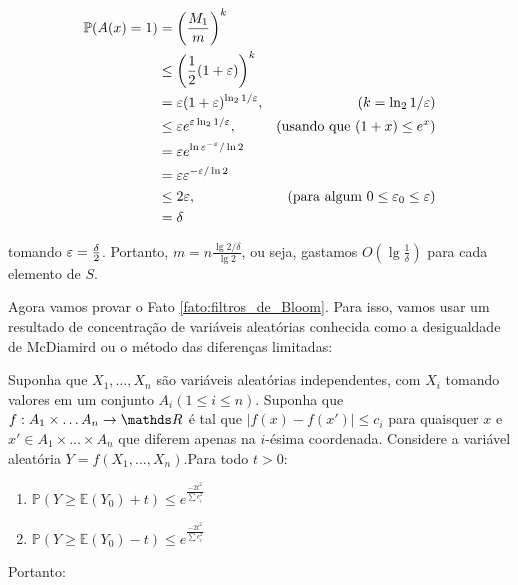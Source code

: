 \begin{align*}
  \mathbb{P}(A(x)=1)&= \left(\frac{M_{1}}{m}\right)^k \\
                    &\leq \left(\frac{1}{2}(1+\eps)\right)^k \\
                    &= \eps(1+\eps)^{\lg_{2}1/\eps}, & \left(k=\lg_{2}1/\eps\right)\\
                    &\leq \eps e^{\eps\lg_{2}1/\eps}, & \left(\text{usando que } (1+x) \leq e^{x}\right)\\
                    &= \eps e^{\lg\eps^{-\eps}/\lg 2}\\
                    &= \eps \eps^{-\eps/\lg 2}\\
                    &\leq 2 \eps, & \left(\text{para algum } 0 \leq \eps_{0} \leq \eps\right)\\
                    &= \delta
\end{align*}

tomando $\varepsilon=\frac{\delta}{2}$. Portanto,
$m=n\frac{\lg 2/\delta}{\lg 2}$, ou seja, gastamos
$O(\lg \frac{1}{\delta})$ para cada elemento de $S$.

Agora vamos provar o Fato \ref{fato:filtros_de_Bloom}. Para isso,
vamos usar um resultado de concentração de variáveis aleatórias
conhecida como a desigualdade de McDiamird ou o método das diferenças
limitadas:

\begin{lema}
\label{lema:McDiamird}
Suponha que $X_{1},\dots,X_{n}$ são variáveis aleatórias
independentes, com $X_{i}$ tomando valores em um conjunto $A_{i}(1
\leq i \leq n)$. Suponha que $f: A_{1}\times \dots A_{n} \rightarrow
\RR$ é tal que $|f(x)-f(x')|\leq c_{i}$ para quaisquer $x$ e $x' \in
A_{1}\times \dots \times A_{n}$ que diferem apenas na $i$-ésima
coordenada. Considere a variável aleatória
$Y=f(X_{1},\dots,X_{n})$.Para todo $t > 0$:

  \begin{enumerate}
    \item $\mathbb{P}(Y \geq \mathbb{E}(Y_0)+t) \leq e^{\frac{-2t^{2}}{\sum c_{i}^{2}}}$
    \item $\mathbb{P}(Y \geq \mathbb{E}(Y_0)-t) \leq e^{\frac{-2t^{2}}{\sum c_{i}^{2}}}$
    \end{enumerate}
\end{lema}

Portanto:

